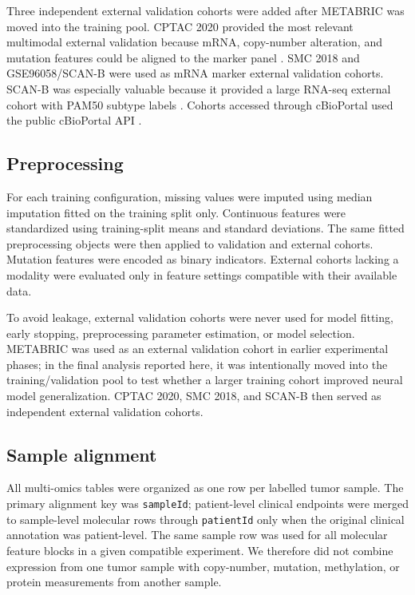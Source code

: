 Three independent external validation cohorts were added after METABRIC was moved into the training pool. CPTAC 2020 provided the most relevant multimodal external validation because mRNA, copy-number alteration, and mutation features could be aligned to the marker panel \cite{krug_cptac_2020}. SMC 2018 and GSE96058/SCAN-B were used as mRNA marker external validation cohorts. SCAN-B was especially valuable because it provided a large RNA-seq external cohort with PAM50 subtype labels \cite{gse96058}. Cohorts accessed through cBioPortal used the public cBioPortal API \cite{cerami_cbioportal_2012,gao_cbioportal_2013}.

\subsection{Preprocessing}

For each training configuration, missing values were imputed using median imputation fitted on the training split only. Continuous features were standardized using training-split means and standard deviations. The same fitted preprocessing objects were then applied to validation and external cohorts. Mutation features were encoded as binary indicators. External cohorts lacking a modality were evaluated only in feature settings compatible with their available data.

To avoid leakage, external validation cohorts were never used for model fitting, early stopping, preprocessing parameter estimation, or model selection. METABRIC was used as an external validation cohort in earlier experimental phases; in the final analysis reported here, it was intentionally moved into the training/validation pool to test whether a larger training cohort improved neural model generalization. CPTAC 2020, SMC 2018, and SCAN-B then served as independent external validation cohorts.

\subsection{Sample alignment}

All multi-omics tables were organized as one row per labelled tumor sample. The primary alignment key was \texttt{sampleId}; patient-level clinical endpoints were merged to sample-level molecular rows through \texttt{patientId} only when the original clinical annotation was patient-level. The same sample row was used for all molecular feature blocks in a given compatible experiment. We therefore did not combine expression from one tumor sample with copy-number, mutation, methylation, or protein measurements from another sample.

